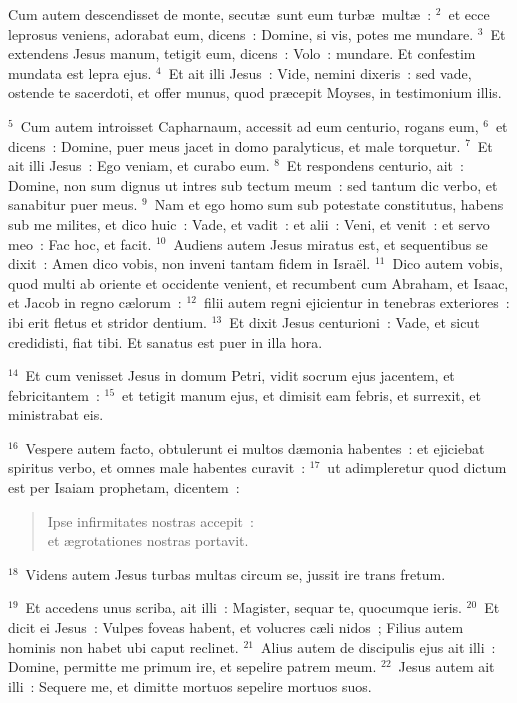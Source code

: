 \lettrine[lines=10,image=true,loversize=0.05,lraise=-0.03]{C}{}um autem descendisset de monte, secut\ae\ sunt eum turb\ae\ mult\ae~:
${}^{2}$~et ecce leprosus veniens, adorabat eum, dicens~: Domine, si vis, potes me mundare.
${}^{3}$~Et extendens Jesus manum, tetigit eum, dicens~: Volo~: mundare. Et confestim mundata est lepra ejus.
${}^{4}$~Et ait illi Jesus~: Vide, nemini dixeris~: sed vade, ostende te sacerdoti, et offer munus, quod pr\ae cepit Moyses, in testimonium illis.


${}^{5}$~Cum autem introisset Capharnaum, accessit ad eum centurio, rogans eum,
${}^{6}$~et dicens~: Domine, puer meus jacet in domo paralyticus, et male torquetur.
${}^{7}$~Et ait illi Jesus~: Ego veniam, et curabo eum.
${}^{8}$~Et respondens centurio, ait~: Domine, non sum dignus ut intres sub tectum meum~: sed tantum dic verbo, et sanabitur puer meus.
${}^{9}$~Nam et ego homo sum sub potestate constitutus, habens sub me milites, et dico huic~: Vade, et vadit~: et alii~: Veni, et venit~: et servo meo~: Fac hoc, et facit.
${}^{10}$~Audiens autem Jesus miratus est, et sequentibus se dixit~: Amen dico vobis, non inveni tantam fidem in Isra\"el.
${}^{11}$~Dico autem vobis, quod multi ab oriente et occidente venient, et recumbent cum Abraham, et Isaac, et Jacob in regno c\ae lorum~:
${}^{12}$~filii autem regni ejicientur in tenebras exteriores~: ibi erit fletus et stridor dentium.
${}^{13}$~Et dixit Jesus centurioni~: Vade, et sicut credidisti, fiat tibi. Et sanatus est puer in illa hora.


${}^{14}$~Et cum venisset Jesus in domum Petri, vidit socrum ejus jacentem, et febricitantem~:
${}^{15}$~et tetigit manum ejus, et dimisit eam febris, et surrexit, et ministrabat eis.


${}^{16}$~Vespere autem facto, obtulerunt ei multos d\ae monia habentes~: et ejiciebat spiritus verbo, et omnes male habentes curavit~:
${}^{17}$~ut adimpleretur quod dictum est per Isaiam prophetam, dicentem~: \begin{flushleft}\begin{verse}Ipse infirmitates nostras accepit~:\\ et \ae grotationes nostras portavit.\end{verse}\end{flushleft}


${}^{18}$~Videns autem Jesus turbas multas circum se, jussit ire trans fretum.


${}^{19}$~Et accedens unus scriba, ait illi~: Magister, sequar te, quocumque ieris.
${}^{20}$~Et dicit ei Jesus~: Vulpes foveas habent, et volucres c\ae li nidos~; Filius autem hominis non habet ubi caput reclinet.
${}^{21}$~Alius autem de discipulis ejus ait illi~: Domine, permitte me primum ire, et sepelire patrem meum.
${}^{22}$~Jesus autem ait illi~: Sequere me, et dimitte mortuos sepelire mortuos suos.


